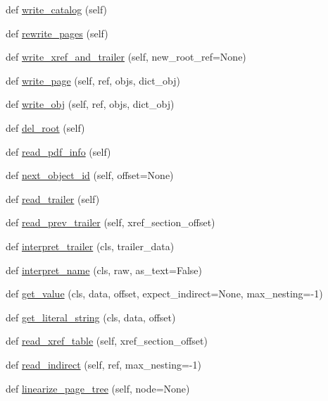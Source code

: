\begin{DoxyCompactItemize}
def \hyperlink{classPIL_1_1PdfParser_1_1PdfParser_ad9c3994545bcda1c22168b33e882f304}{write\+\_\+catalog} (self)
\item 
def \hyperlink{classPIL_1_1PdfParser_1_1PdfParser_acac8fa994097c5709d61b11f3cb48c8c}{rewrite\+\_\+pages} (self)
\item 
def \hyperlink{classPIL_1_1PdfParser_1_1PdfParser_a120a52578e11cffedbeed4d5751aa13f}{write\+\_\+xref\+\_\+and\+\_\+trailer} (self, new\+\_\+root\+\_\+ref=None)
\item 
def \hyperlink{classPIL_1_1PdfParser_1_1PdfParser_a1ee41b09dcc0d396762e4741e71de6f5}{write\+\_\+page} (self, ref, objs, dict\+\_\+obj)
\item 
def \hyperlink{classPIL_1_1PdfParser_1_1PdfParser_ae9459909fb719aff43b906ab425c4902}{write\+\_\+obj} (self, ref, objs, dict\+\_\+obj)
\item 
def \hyperlink{classPIL_1_1PdfParser_1_1PdfParser_a7f8f973540a7527989a658c8b084d483}{del\+\_\+root} (self)
\item 
def \hyperlink{classPIL_1_1PdfParser_1_1PdfParser_a5f294964b39184664844c5afe0528d16}{read\+\_\+pdf\+\_\+info} (self)
\item 
def \hyperlink{classPIL_1_1PdfParser_1_1PdfParser_a2cc0ce24007b8697333dddb7c50ce84e}{next\+\_\+object\+\_\+id} (self, offset=None)
\item 
def \hyperlink{classPIL_1_1PdfParser_1_1PdfParser_ab3f3768e72fdb9a4e72b099976e35749}{read\+\_\+trailer} (self)
\item 
def \hyperlink{classPIL_1_1PdfParser_1_1PdfParser_aee6258c9025bc731265b9f12e1415cad}{read\+\_\+prev\+\_\+trailer} (self, xref\+\_\+section\+\_\+offset)
\item 
def \hyperlink{classPIL_1_1PdfParser_1_1PdfParser_a46ffbd92b4156b73a5f7453f22f40815}{interpret\+\_\+trailer} (cls, trailer\+\_\+data)
\item 
def \hyperlink{classPIL_1_1PdfParser_1_1PdfParser_ab9de4bd8df9bf8b8f112f8d558ae80b6}{interpret\+\_\+name} (cls, raw, as\+\_\+text=False)
\item 
def \hyperlink{classPIL_1_1PdfParser_1_1PdfParser_a6d5063c2d60862c9def5082c4f13dcde}{get\+\_\+value} (cls, data, offset, expect\+\_\+indirect=None, max\+\_\+nesting=-\/1)
\item 
def \hyperlink{classPIL_1_1PdfParser_1_1PdfParser_a17c292910d1c837e4b005203c2753732}{get\+\_\+literal\+\_\+string} (cls, data, offset)
\item 
def \hyperlink{classPIL_1_1PdfParser_1_1PdfParser_af084f9cd40a1deef31faca74cda19691}{read\+\_\+xref\+\_\+table} (self, xref\+\_\+section\+\_\+offset)
\item 
def \hyperlink{classPIL_1_1PdfParser_1_1PdfParser_a2c59c8efb182be015ebb309d8cc7c4d2}{read\+\_\+indirect} (self, ref, max\+\_\+nesting=-\/1)
\item 
def \hyperlink{classPIL_1_1PdfParser_1_1PdfParser_a952a2dfacb4c1e60a3f4ae30a9142665}{linearize\+\_\+page\+\_\+tree} (self, node=None)
\end{DoxyCompactItemize}
